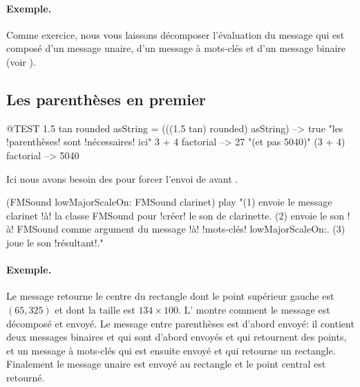 \documentclass[a4paper,10pt,twoside]{book}
\begin{document}
\paragraph{Exemple.} Comme exercice, nous vous laissons d\'ecomposer
l'\'evaluation du message  qui est compos\'e
d'un message unaire, d'un message \`a mots-cl\'es et d'un message
binaire (voir ).

\subsection{Les parenth\`eses en premier}


\begin{code}{@TEST}
1.5 tan rounded asString = (((1.5 tan) rounded) asString) --> true    "les !parenth\`eses! sont !n\'ecessaires! ici"
3 + 4 factorial   --> 27    "(et pas 5040)"
(3 + 4) factorial --> 5040
\end{code}

Ici nous avons besoin des  pour forcer l'envoi de  avant .
\begin{code}{}
(FMSound lowMajorScaleOn: FMSound clarinet) play 
"(1) envoie le message clarinet !\`a! la classe FMSound pour !cr\'eer! le son de clarinette.
 (2) envoie le son !\`a! FMSound comme argument du message !\`a! !mots-cl\'es! lowMajorScaleOn:.
 (3) joue le son !r\'esultant!."
\end{code}



\paragraph{Exemple.}
Le message  retourne le centre
du rectangle dont le point sup\'erieur gauche est $(65, 325)$ et dont
la taille est $134{\times}100$. L' montre comment le
message est d\'ecompos\'e et envoy\'e. Le message entre parenth\`eses
est d'abord envoy\'e: il contient deux messages binaires 
et  qui sont d'abord envoy\'es et qui retournent des
points, et un message \`a mots-cl\'es  qui est ensuite
envoy\'e et qui retourne un rectangle. Finalement le message unaire
 est envoy\'e au rectangle et le point central est retourn\'e.
\end{document}
